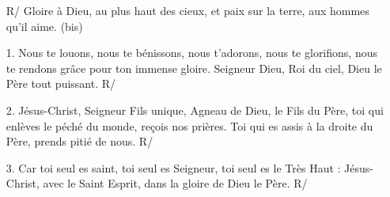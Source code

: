 \begin{itemize}
\item[R/] 
Gloire à Dieu, au plus haut des cieux, et paix sur la terre, aux hommes qu'il aime. (bis)
\item[1.]
Nous te louons, nous te bénissons, nous t’adorons, nous te glorifions, nous   
      te rendons grâce pour ton immense gloire. Seigneur Dieu, Roi du ciel, Dieu 
      le Père tout puissant. R/
\item[2.]
Jésus-Christ, Seigneur Fils unique, Agneau de Dieu, le Fils du Père, toi qui 
      enlèves le péché du monde, reçois nos prières. Toi qui es assis à la droite  
      du Père, prends pitié de nous. R/
\item[3.]
Car toi seul es saint, toi seul es Seigneur, toi seul es le Très Haut : 
      Jésus-Christ, avec le Saint Esprit, dans la gloire de Dieu le Père. R/
\end{itemize}

